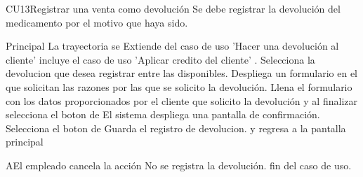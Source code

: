 \begin{UseCase}{CU13}{Registrar una venta como devolución}{
	Se debe registrar la devolución del medicamento por el motivo que haya sido.
	}
	\end{UseCase}
	\begin{UCtrayectoria}{Principal}
		\UCpaso La trayectoria se Extiende del caso de uso 'Hacer una devolución al cliente'  
		\UCpaso incluye el caso de uso 'Aplicar credito del cliente' .
		\UCpaso [\UCactor] Selecciona la devolucion que desea registrar entre las disponibles.
		\UCpaso Despliega un formulario en el que solicitan las razones por las que se solicito la devolución.
		\UCpaso [\UCactor] Llena el formulario con los datos proporcionados por el cliente que solicito la devolución y al finalizar selecciona el boton de  	
		\UCpaso El sistema despliega una pantalla de confirmación.
		\UCpaso [\UCactor] Selecciona el boton de  
		\UCpaso Guarda el registro de devolucion. y regresa a la pantalla principal 
		
	\end{UCtrayectoria}

\begin{UCtrayectoriaA}{A}{El empleado cancela la acción}
			\UCpaso No se registra la devolución.
			\UCpaso fin del caso de uso.
		\end{UCtrayectoriaA}	
	


